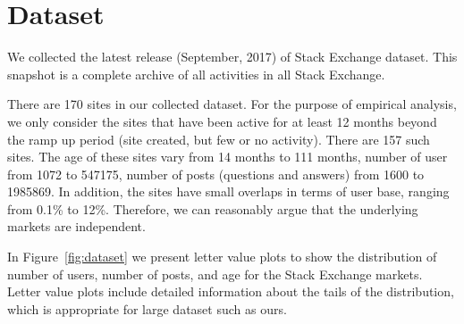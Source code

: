 \section{Dataset} 
We collected the latest release (September, 2017) of Stack Exchange dataset. This snapshot is a complete archive of all activities in all Stack Exchange. 

There are 170 sites in our collected dataset. For the purpose of empirical analysis, we only consider the sites that have been active for at least 12 months beyond the ramp up period (site created, but few or no activity). There are 157 such sites. The age of these sites vary from 14 months to 111 months, number of user from 1072 to 547175, number of posts (questions and answers) from 1600 to 1985869. In addition, the sites have small overlaps in terms of user base, ranging from 0.1\% to 12\%. Therefore, we can reasonably argue that the underlying markets are independent. 

In Figure~\ref{fig:dataset} we present letter value plots to show the distribution of number of users, number of posts, and age for the Stack Exchange markets. Letter value plots include detailed information about the tails of the distribution, which is appropriate for large dataset such as ours. 

